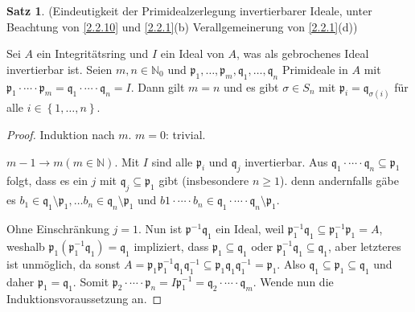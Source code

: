 \documentclass[
twoside=semi,
fontsize=12,
DIV=12, 
cleardoublepage=current,
leqno,
headings=optiontoheadandtoc, 
toc=idx
]{scrbook}
\newcommand{\N}{\mathbb{N}}
\newcommand{\set}[1]{\left\{ #1 \right\}}
\theoremstyle{definition}
\newtheorem{satz}[definition]{Satz}
\begin{document}
 	\begin{satz}\label{2.2.11}
 		(Eindeutigkeit der Primidealzerlegung invertierbarer Ideale, unter Beachtung von \ref{2.2.10} und \ref{2.2.1}(b) Verallgemeinerung von \ref{2.2.1}(d))
 		
 		Sei $A$ ein Integrit\"atsring und $I$ ein Ideal von $A$, was als gebrochenes Ideal invertierbar ist. Seien $m, n \in \N_0$ und $\mathfrak{p}_1,\dots, \mathfrak{p}_m,\mathfrak{q}_1,\dots,\mathfrak{q}_n$ Primideale in $A$ mit $\mathfrak{p}_1\cdot \cdots \cdot \mathfrak{p}_m = \mathfrak{q}_1 \cdot \cdots \cdot \mathfrak{q}_n = I$. Dann gilt $m = n$ und es gibt $\sigma \in S_n$ mit $\mathfrak{p}_i = \mathfrak{q}_{\sigma(i)}$ f\"ur alle $i \in \set{1,\dots, n}$.
 		
 		\begin{proof}
 			Induktion nach $m$. $m = 0$: trivial.
 			
 			$m-1 \to m (m \in \N)$. Mit $I$ sind alle $\mathfrak{p}_i$ und $\mathfrak{q}_j$ invertierbar. Aus $\mathfrak{q}_1\cdot \cdots \cdot \mathfrak{q}_n \subseteq \mathfrak{p}_1$ folgt, dass es ein $j$ mit $\mathfrak{q}_j \subseteq \mathfrak{p}_1$ gibt (insbesondere $n\geq 1$). denn andernfalls g\"abe es $b_1 \in \mathfrak{q}_1\setminus \mathfrak{p}_1, \dots b_n \in \mathfrak{q}_n\setminus \mathfrak{p}_1$ und $b1\cdot \cdots \cdot b_n \in \mathfrak{q}_1\cdot \cdots \cdot \mathfrak{q}_n \setminus \mathfrak{p}_1$.
 			
 			Ohne Einschr\"ankung $j=1$. Nun ist $\mathfrak{p}^{-1}\mathfrak{q}_1$ ein Ideal, weil $\mathfrak{p}_1^{-1}\mathfrak{q}_1 \subseteq \mathfrak{p}_1^{-1}\mathfrak{p}_1 = A$, weshalb $\mathfrak{p}_1(\mathfrak{p}_1^{-1}\mathfrak{q}_1) = \mathfrak{q}_1$ impliziert, dass $\mathfrak{p}_1 \subseteq \mathfrak{q}_1$ oder $\mathfrak{p}_1^{-1}\mathfrak{q}_1 \subseteq \mathfrak{q}_1$, aber letzteres ist unm\"oglich, da sonst $A = \mathfrak{p}_1\mathfrak{p}_1^{-1}\mathfrak{q}_1\mathfrak{q}_1^{-1}\subseteq \mathfrak{p}_1\mathfrak{q}_1\mathfrak{q}_1^{-1} = \mathfrak{p}_1$. Also $\mathfrak{q}_1 \subseteq \mathfrak{p}_1 \subseteq \mathfrak{q}_1$ und daher $\mathfrak{p}_1 = \mathfrak{q}_1$. Somit $\mathfrak{p}_2 \cdot \cdots \cdot \mathfrak{p}_n = I\mathfrak{p}_1^{-1} = \mathfrak{q}_2 \cdot \cdots \cdot \mathfrak{q}_m$. Wende nun die Induktionsvoraussetzung an.
 		\end{proof}
 	\end{satz}
 
\end{document}
